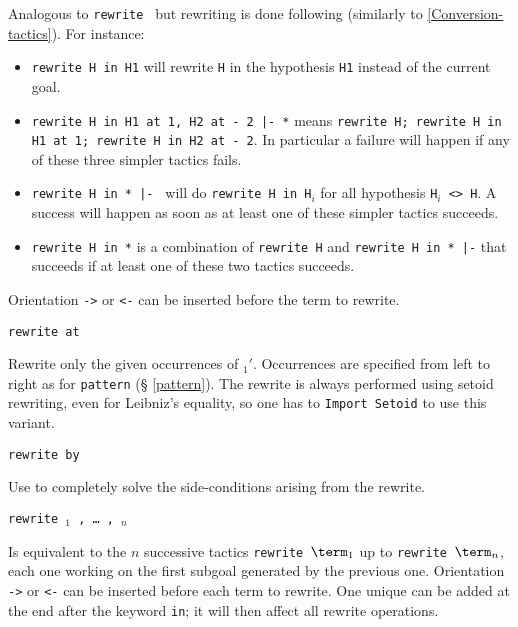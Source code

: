 \begin{coq_example*}
\begin{Variants}
  Analogous to {\tt rewrite {\term}} but rewriting is done following
   (similarly to \ref{Conversion-tactics}). For
  instance:
  \begin{itemize}
  \item \texttt{rewrite H in H1} will rewrite \texttt{H} in the hypothesis
    \texttt{H1} instead of the current goal.
  \item \texttt{rewrite H in H1 at 1, H2 at - 2 |- *} means \texttt{rewrite H; rewrite H in H1 at 1;
      rewrite H in H2 at - 2}. In particular a failure will happen if any of
    these three simpler tactics fails.
  \item \texttt{rewrite H in * |- } will do \texttt{rewrite H in
      H$_i$} for all hypothesis \texttt{H$_i$ <> H}. A success will happen
    as soon as at least one of these simpler tactics succeeds.
  \item \texttt{rewrite H in *} is a combination of \texttt{rewrite H}
    and \texttt{rewrite H in * |-} that succeeds if at
    least one of these two tactics succeeds.
  \end{itemize}
  Orientation {\tt ->} or {\tt <-} can be
  inserted before the term to rewrite.

\item {\tt rewrite {\term} at {\occlist}}

  Rewrite only the given occurrences of \term$_1'$. Occurrences are
  specified from left to right as for \texttt{pattern} (\S
  \ref{pattern}). The rewrite is always performed using setoid
  rewriting, even for Leibniz's equality, so one has to
  \texttt{Import Setoid} to use this variant.

\item {\tt rewrite {\term} by {\tac}}

  Use {\tac} to completely solve the side-conditions arising from the
  rewrite.

\item {\tt rewrite \term$_1$ , \mbox{\dots} , \term$_n$}

  Is equivalent to the $n$ successive tactics {\tt rewrite $\term_1$}
  up to {\tt rewrite $\term_n$}, each one working on the first subgoal
  generated by the previous one.
  Orientation {\tt ->} or {\tt <-} can be
  inserted before each term to rewrite. One unique 
  can be added at the end after the keyword {\tt in}; it will
  then affect all rewrite operations.


\end{Variants}
\end{coq_example*}

